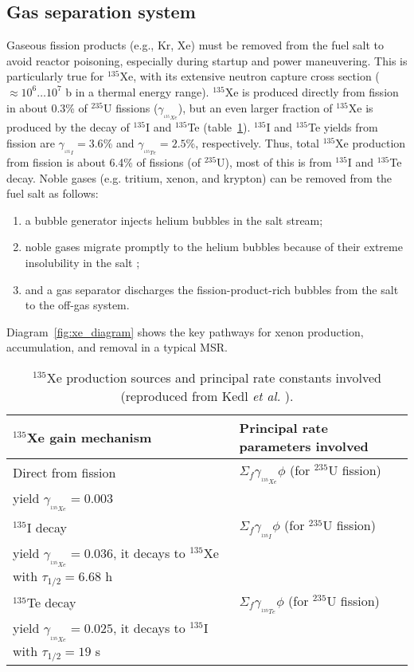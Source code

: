 \subsection{Gas separation system} \label{sec:gas-separ}
Gaseous fission products (e.g., Kr, Xe) must be removed from the fuel salt 
to avoid reactor poisoning, especially during startup and power maneuvering. 
This is particularly true for $^{135}$Xe, with its extensive neutron capture 
cross section ($\approx10^6\dots10^7$ b in a thermal energy range). $^{135}$Xe 
is produced directly from fission in about 0.3\% of $^{235}$U fissions 
($\gamma_{_{^{135}Xe}}$), but an even larger fraction of $^{135}$Xe is 
produced by the decay of $^{135}$I and $^{135}$Te (table~\ref{tab:xe_gain}). 
$^{135}$I and $^{135}$Te yields from fission are 
$\gamma_{_{^{135}I}}\!=3.6$\% and $\gamma_{_{^{135}Te}}\!=2.5$\%, 
respectively. Thus, total $^{135}$Xe production  
from fission is about 6.4\% of fissions (of $^{235}$U), most of this is from 
$^{135}$I and $^{135}$Te decay. Noble gases (e.g. tritium, xenon, and krypton) can 
be removed from the fuel salt as follows:
\begin{enumerate}[label=(\alph*)]
    \item a bubble generator injects helium bubbles in the salt stream;
    \item noble gases migrate promptly to the helium bubbles because 
              of their extreme insolubility in the salt 
              \cite{robertson_conceptual_1971};
    \item and a gas separator discharges the fission-product-rich bubbles from 
              the salt to the off-gas system.
\end{enumerate}
Diagram~\ref{fig:xe_diagram} shows the key pathways for xenon 
production, accumulation, and removal in a typical \gls{MSR}.
\begin{table}[ht!]
	\caption{$^{135}$Xe production sources and principal rate constants 
		involved
		(reproduced from Kedl \emph{et al.} \cite{kedl_development_1967}).}
	\centering
	\begin{tabularx}{\textwidth}{b  b}
		\hline \textbf{$^{135}$Xe gain mechanism} & \textbf{Principal rate 
			parameters involved}  	\\ [5pt] \hline 
		Direct from fission & $\Sigma_f \gamma_{_{^{135}Xe}}\phi$ (for 
		$^{235}$U fission) \\
		yield $\gamma_{_{^{135}Xe}}\!\!\!=0.003$ & \\ [5pt] \hline 
		$^{135}$I decay     & $\Sigma_f \gamma_{_{^{135}I}}\phi$ (for 
		$^{235}$U fission) \\
		yield $\gamma_{_{^{135}Xe}}\!\!\!=0.036$, it decays to $^{135}$Xe with 
		$\tau_{1/2}=6.68$ h & 			                    \\	[5pt]	\hline 
		$^{135}$Te decay    & $\Sigma_f \gamma_{_{^{135}Te}}\phi$ (for 
		$^{235}$U 		fission) \\
		yield $\gamma_{_{^{135}Xe}}\!\!\!=0.025$, 
		it decays to $^{135}$I with $\tau_{1/2}=19$ s 
		& 			                    \\ [5pt]	\hline
	\end{tabularx}
	\label{tab:xe_gain}
\end{table}
